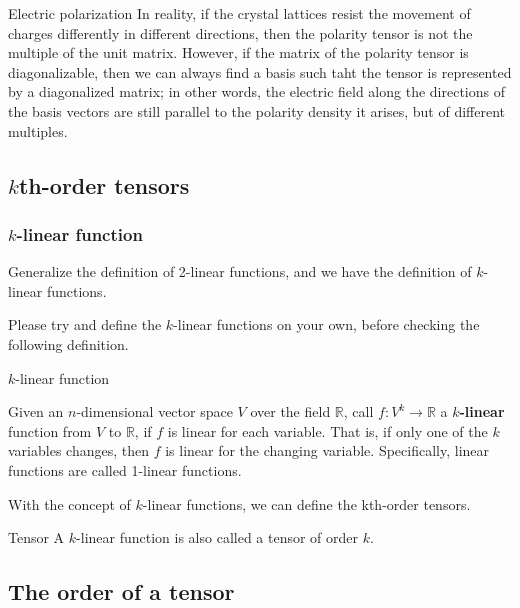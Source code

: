 \begin{example}{Electric polarization}
In reality, if the crystal lattices resist the movement of charges differently in different directions, then the polarity tensor is not the multiple of the unit matrix. However, if the matrix of the polarity tensor is diagonalizable, then we can always find a basis such taht the tensor is represented by a diagonalized matrix; in other words, the electric field along the directions of the basis vectors are still parallel to the polarity density it arises, but of different multiples. 

\end{example}


\subsection{$k$th-order tensors}

\subsubsection{$k$-linear function}

Generalize the definition of 2-linear functions, and we have the definition of $k$-linear functions. 

\begin{exercise}{}
Please try and define the $k$-linear functions on your own, before checking the following definition. 
\end{exercise}

\begin{definition}{$k$-linear function}

Given an $n$-dimensional vector space $V$ over the field $\mathbb{R}$, call $f:V^k\rightarrow \mathbb{R}$ a \textbf{$k$-linear} function from $V$ to $\mathbb{R}$, if $f$ is linear for each variable. That is, if only one of the $k$ variables changes, then $f$ is linear for the changing variable. Specifically, linear functions are called 1-linear functions. 
\end{definition}

With the concept of $k$-linear functions, we can define the kth-order tensors. 

\begin{definition}{Tensor}
A $k$-linear function is also called a tensor of order $k$. 
\end{definition}


\subsection{The order of a tensor}


